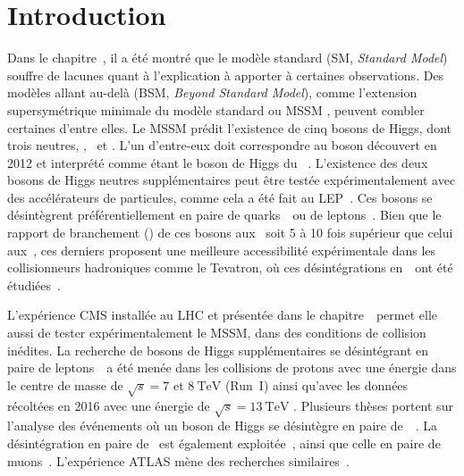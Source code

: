 \section{Introduction}\label{chapter-HTT_analysis-section-introduction}
Dans le chapitre~,
il a été montré que le modèle standard (SM, \emph{Standard Model}) souffre de lacunes quant à l'explication à apporter à certaines observations.
Des modèles allant au-delà (BSM, \emph{Beyond Standard Model}),
comme l'extension supersymétrique minimale du modèle standard ou \og MSSM \fg,
peuvent combler certaines d'entre elles.
Le MSSM prédit l'existence de cinq bosons de Higgs, dont trois neutres, \higgs, \Higgs\ et \HiggsA.
L'un d'entre-eux doit correspondre au boson découvert en 2012 et interprété comme étant le boson de Higgs du \SM~\cite{ATLAS_Higgs_discovery,CMS_Higgs_discovery,CMS_Higgs_discovery_2013,ATLAS-CMS-Higgs_combined_1,ATLAS-CMS-Higgs_combined_2}.
L'existence des deux bosons de Higgs neutres supplémentaires peut être testée expérimentalement avec des accélérateurs de particules,
comme cela a été fait au LEP~\cite{Schael:2006cr}.
Ces bosons se désintègrent préférentiellement en paire de quarks~\quarkb\ ou de leptons~\tau.
Bien que le rapport de branchement (\BR) de ces bosons aux \quarkb\ soit 5 à 10 fois supérieur que celui aux~\tau,
ces derniers proposent une meilleure accessibilité expérimentale dans les collisionneurs hadroniques comme le Tevatron,
où ces désintégrations en~\tau\ ont été étudiées~\cite{Aaltonen:2009vf,Abazov:2011jh}.
\par
L'expérience CMS installée au LHC et présentée dans le chapitre~\ permet elle aussi de tester expérimentalement le MSSM, dans des conditions de collision inédites.
La recherche de bosons de Higgs supplémentaires se désintégrant en paire de leptons~\tau\ a été menée dans les collisions de protons avec une énergie dans le centre de masse de $\sqrt{s}=\num{7}$ et $\SI{8}{\TeV}$ (Run~I) \cite{Chatrchyan:2012vp,CMS-MSSM-HTT_2014,CMS-PAS-HIG-13-021,CMS-PAS-HIG-14-029} ainsi qu'avec les données récoltées en 2016 avec une énergie de $\sqrt{s}=\SI{13}{\TeV}$ \cite{CMS-PAS-HIG-17-020}.
Plusieurs thèses portent sur l'analyse des événements où un boson de Higgs se désintègre en paire de~\tau~\cite{Gael_thesis,Artur_thesis}.
La désintégration en paire de \quarkb\ est également exploitée~\cite{Chatrchyan:2013qga,Khachatryan:2015tra},
ainsi que celle en paire de muons~\cite{CMS:2015ooa}.
L'expérience ATLAS mène des recherches similaires~\cite{Aad:2012cfr,ATLAS-MSSM-HTT_2018,ATLAS-MSSM-HTT_2020}.
\par
